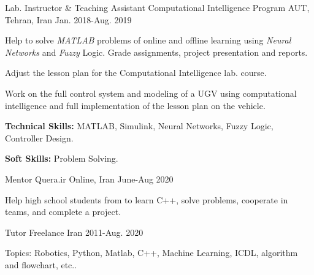 \begin{cventries}
\cventry
{Lab. Instructor \& Teaching Assistant}
{Computational Intelligence Program}
{AUT, Tehran, Iran}
{Jan. 2018-Aug. 2019}
{
  \begin{cvitems} %
    \item{Help to solve \textit{MATLAB} problems of online and offline learning using \textit{Neural Networks} and \textit{Fuzzy} Logic. Grade assignments, project presentation and reports.}
    \item{Adjust the lesson plan for the Computational Intelligence lab. course.}
    \item{Work on the full control system and modeling of a UGV using computational intelligence and full implementation of the lesson plan on the vehicle.}
    \item {\textbf{Technical Skills:} MATLAB, Simulink, Neural Networks, Fuzzy Logic, Controller Design.}
\item {\textbf{Soft Skills:} Problem Solving.}
  \end{cvitems}
}

\cventry
{Mentor}
{Quera.ir}
{Online, Iran}
{June-Aug 2020}
{
  \begin{cvitems} %
    \item{Help high school students from to learn C++, solve problems, cooperate in teams, and complete a project.}
  \end{cvitems}
}

\cventry
{Tutor}
{Freelance}
{Iran}
{2011-Aug. 2020}
{
  \begin{cvitems} %
    \item{Topics: Robotics, Python, Matlab, C++, Machine Learning, ICDL, algorithm and flowchart, etc..}
  \end{cvitems}
}
\end{cventries}
